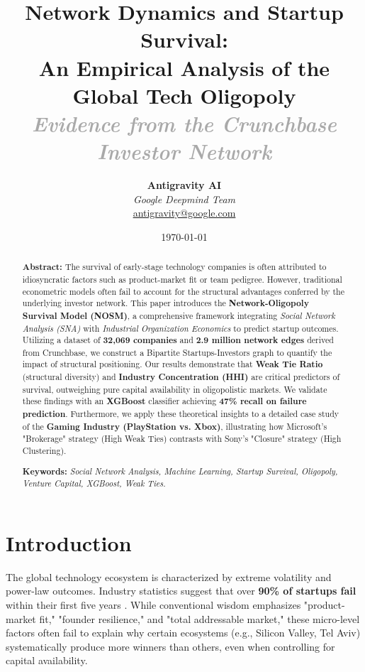 \documentclass[11pt, a4paper]{article}
\title{
    \vspace{-2cm}
    \begingroup
    \color{primary}
    \huge \textbf{Network Dynamics and Startup Survival: \\ An Empirical Analysis of the Global Tech Oligopoly} \\
    \vspace{0.5cm}
    \large \textcolor{darkgray}{\textit{Evidence from the Crunchbase Investor Network}}
    \endgroup
}
\author{\textbf{Antigravity AI} \\ \textit{Google Deepmind Team} \\ \href{mailto:antigravity@google.com}{antigravity@google.com}}
\date{\today}
\begin{document}
\maketitle

\begin{abstract}
    \noindent \textbf{\textcolor{primary}{Abstract:}}
    The survival of early-stage technology companies is often attributed to idiosyncratic factors such as product-market fit or team pedigree. However, traditional econometric models often fail to account for the structural advantages conferred by the underlying investor network. This paper introduces the \textbf{Network-Oligopoly Survival Model (NOSM)}, a comprehensive framework integrating \textit{Social Network Analysis (SNA)} with \textit{Industrial Organization Economics} to predict startup outcomes. Utilizing a dataset of \textbf{32,069 companies} and \textbf{2.9 million network edges} derived from Crunchbase, we construct a Bipartite Startups-Investors graph to quantify the impact of structural positioning. Our results demonstrate that \textbf{Weak Tie Ratio} (structural diversity) and \textbf{Industry Concentration (HHI)} are critical predictors of survival, outweighing pure capital availability in oligopolistic markets. We validate these findings with an \textbf{XGBoost} classifier achieving \textbf{47\% recall on failure prediction}. Furthermore, we apply these theoretical insights to a detailed case study of the \textbf{Gaming Industry (PlayStation vs. Xbox)}, illustrating how Microsoft's "Brokerage" strategy (High Weak Ties) contrasts with Sony's "Closure" strategy (High Clustering).
    
    \vspace{0.5em}
    \noindent \textbf{Keywords:} \textit{Social Network Analysis, Machine Learning, Startup Survival, Oligopoly, Venture Capital, XGBoost, Weak Ties.}
\end{abstract}

\newpage
\tableofcontents
\newpage

\section{Introduction}

The global technology ecosystem is characterized by extreme volatility and power-law outcomes. Industry statistics suggest that over \textbf{90\% of startups fail} within their first five years \citep{blank2013}. While conventional wisdom emphasizes "product-market fit," "founder resilience," and "total addressable market," these micro-level factors often fail to explain why certain ecosystems (e.g., Silicon Valley, Tel Aviv) systematically produce more winners than others, even when controlling for capital availability.
\end{document}
